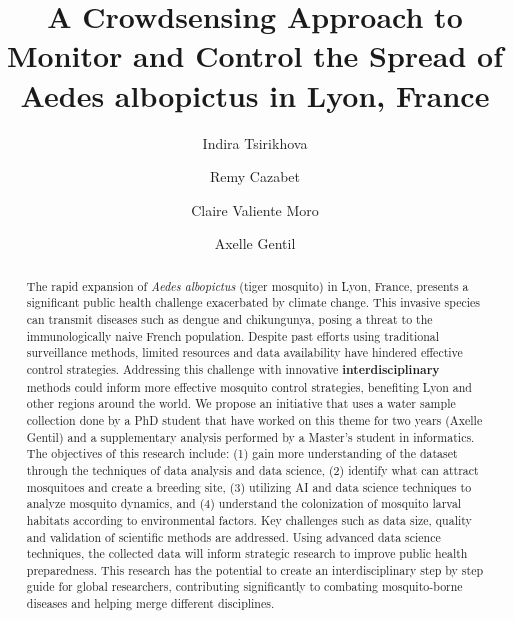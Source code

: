 \documentclass[acmlarge]{acmart}
\begin{document}
\title{A Crowdsensing Approach to Monitor and Control the Spread of Aedes albopictus in Lyon, France}

\author{Indira Tsirikhova}

\author{Remy Cazabet}

\author{Claire Valiente Moro}

\author{Axelle Gentil}

\begin{abstract}
The rapid expansion of \textit{Aedes albopictus} (tiger mosquito) in Lyon, France, presents a significant public health challenge exacerbated by climate change\cite{10.1093/femsec/fiae129}. This invasive species can transmit diseases such as dengue and chikungunya, posing a threat to the immunologically naive French population\cite{10_24072_pcjournal_326}. Despite past efforts using traditional surveillance methods, limited resources and data availability have hindered effective control strategies. Addressing this challenge with innovative \textbf{interdisciplinary} methods could inform more effective mosquito control strategies, benefiting Lyon and other regions around the world.
We propose an initiative that uses a water sample collection done by a PhD student that have worked on this theme for two years (Axelle Gentil) and a supplementary analysis performed by a Master's student in informatics. The objectives of this research include: (1) gain more understanding of the dataset through the techniques of data analysis and data science, (2) identify what can attract mosquitoes and create a breeding site, (3) utilizing AI and data science techniques to analyze mosquito dynamics, and (4) understand the colonization of mosquito larval habitats according to environmental factors.
Key challenges such as data size, quality and validation of scientific methods are addressed. Using advanced data science techniques, the collected data will inform strategic research to improve public health preparedness. This research has the potential to create an interdisciplinary step by step guide for global researchers, contributing significantly to combating mosquito-borne diseases and helping merge different disciplines\cite{ijerph19106337}\cite{zivko_juznic_zonta_2022_6534797}.
\end{abstract}
\end{document}
